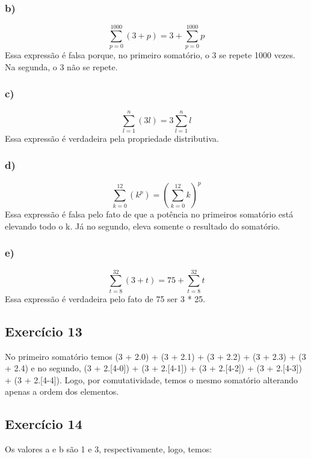 \documentclass[12pt]{article}
\begin{document}
\subsubsection{b)}
\begingroup
\LARGE    
\begin{equation}
    \sum_{p=0}^{1000}(3 + p) = 3 + \sum_{p=0}^{1000}p
\end{equation}
\endgroup
Essa expressão é falsa porque, no primeiro somatório, o 3 se repete 1000 vezes. Na segunda, o 3 não se repete.
\subsubsection{c)}
\begingroup
\LARGE    
\begin{equation}
    \sum_{l=1}^{n}(3l) = 3\sum_{l=1}^{n}l
\end{equation}
\endgroup
Essa expressão é verdadeira pela propriedade distributiva.
\subsubsection{d)}
\begingroup
\LARGE    
\begin{equation}
    \sum_{k=0}^{12}(k^p) = (\sum_{k=0}^{12}k)^p
\end{equation}
\endgroup
Essa expressão é falsa pelo fato de que a potência no primeiros somatório está elevando todo o k. Já no segundo, eleva somente o resultado do somatório.
\subsubsection{e)}
\begingroup
\LARGE    
\begin{equation}
    \sum_{t=8}^{32}(3 + t) = 75 + \sum_{t=8}^{32}t
\end{equation}
\endgroup
Essa expressão é verdadeira pelo fato de 75 ser 3 * 25.
\subsection{Exercício 13}
No primeiro somatório temos (3 + 2.0) + (3 + 2.1) + (3 + 2.2) + (3 + 2.3) +
(3 + 2.4) e no segundo, (3 + 2.[4-0]) + (3 + 2.[4-1]) + (3 + 2.[4-2]) + (3 +
2.[4-3]) + (3 + 2.[4-4]). Logo, por comutatividade, temos o mesmo
somatório alterando apenas a ordem dos elementos.
\subsection{Exercício 14}
Os valores a e b são 1 e 3, respectivamente, logo, temos:
\end{document}
